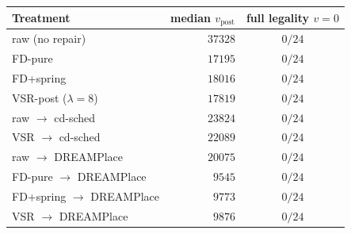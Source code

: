 \begin{tabular}{l|rc}
\toprule
Treatment & median $v_\text{post}$ & full legality $v{=}0$ \\
\midrule
raw (no repair) & $37328$ & $0/24$ \\
FD-pure & $17195$ & $0/24$ \\
FD+spring & $18016$ & $0/24$ \\
VSR-post ($\lambda{=}8$) & $17819$ & $0/24$ \\
raw $\to$ cd-sched & $23824$ & $0/24$ \\
VSR $\to$ cd-sched & $22089$ & $0/24$ \\
raw $\to$ DREAMPlace & $20075$ & $0/24$ \\
FD-pure $\to$ DREAMPlace & $9545$ & $0/24$ \\
FD+spring $\to$ DREAMPlace & $9773$ & $0/24$ \\
VSR $\to$ DREAMPlace & $9876$ & $0/24$ \\
\bottomrule
\end{tabular}
